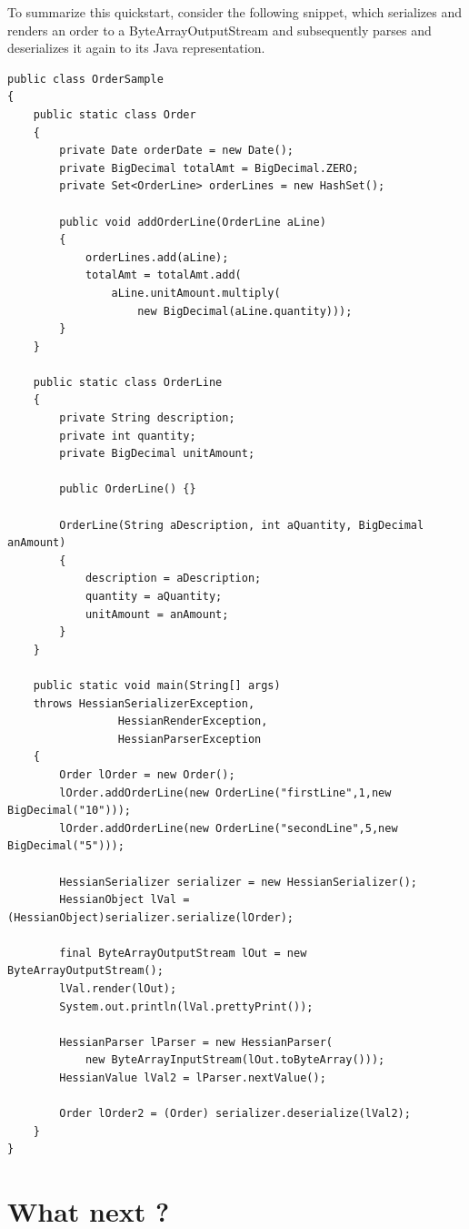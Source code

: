 \documentclass[a4paper]{article}
\begin{document}
To summarize this quickstart, consider the following snippet, which serializes and renders an order to a ByteArrayOutputStream and subsequently parses and deserializes it again to its Java representation.

\medskip
\begin{lstlisting}
public class OrderSample
{
    public static class Order
    {
        private Date orderDate = new Date();
        private BigDecimal totalAmt = BigDecimal.ZERO;
        private Set<OrderLine> orderLines = new HashSet();

        public void addOrderLine(OrderLine aLine)
        {
            orderLines.add(aLine);
            totalAmt = totalAmt.add(
                aLine.unitAmount.multiply(
                    new BigDecimal(aLine.quantity)));
        }
    }

    public static class OrderLine
    {
        private String description;
        private int quantity;
        private BigDecimal unitAmount;

        public OrderLine() {}
        
        OrderLine(String aDescription, int aQuantity, BigDecimal anAmount)
        {
            description = aDescription;
            quantity = aQuantity;
            unitAmount = anAmount;
        }
    }

    public static void main(String[] args) 
    throws HessianSerializerException, 
                 HessianRenderException, 
                 HessianParserException
    {
        Order lOrder = new Order();
        lOrder.addOrderLine(new OrderLine("firstLine",1,new BigDecimal("10")));
        lOrder.addOrderLine(new OrderLine("secondLine",5,new BigDecimal("5")));

        HessianSerializer serializer = new HessianSerializer();
        HessianObject lVal = (HessianObject)serializer.serialize(lOrder);

        final ByteArrayOutputStream lOut = new ByteArrayOutputStream();
        lVal.render(lOut);
        System.out.println(lVal.prettyPrint());

        HessianParser lParser = new HessianParser(
            new ByteArrayInputStream(lOut.toByteArray()));
        HessianValue lVal2 = lParser.nextValue();

        Order lOrder2 = (Order) serializer.deserialize(lVal2);
    }
}
\end{lstlisting}
\medskip

\section{What next ?}
\end{document}
